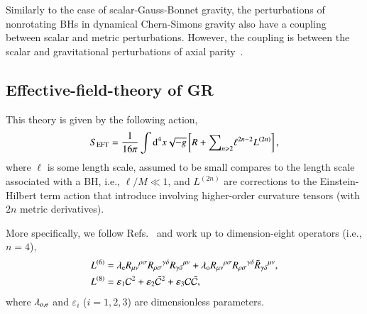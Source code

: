 \documentclass[twocolumn,prd,aps,superscriptaddress,preprintnumbers,tightenlines,showpacs,nofootinbib,amsfonts,amsmath,longbibliography]{revtex4-1}
\newcommand{\dd}{{\rm d}}
\newcommand{\lame}{\lambda_{\rm e}}
\newcommand{\lamo}{\lambda_{\rm o}}
\begin{document}
Similarly to the case of scalar-Gauss-Bonnet gravity, the perturbations of nonrotating
BHs in dynamical Chern-Simons gravity also have a coupling between scalar and
metric perturbations. However, the coupling is between the scalar and gravitational perturbations
of axial parity~\cite{Yunes:2007ss,Cardoso:2009pk,Molina:2010fb,Wagle:2021tam}.

%
%
%

\subsection{Effective-field-theory of GR}

This theory is given by the following action,
%
\begin{equation} \label{eq:action_eft}
    S_{\rm EFT} = \frac{1}{16 \pi}
    \int \dd^4x \sqrt{-g}
    \left[ R
    +
    {\sum}_{n \geqslant 2} \ell^{2n - 2} L^{(2n)}
    \right],
\end{equation}
%
where $\ell$ is some length scale, assumed to be small compares to the length
scale associated with a BH, i.e., $\ell / M \ll 1$, and
$L^{(2n)}$ are corrections to the Einstein-Hilbert term action that
introduce involving higher-order curvature tensors (with $2n$ metric
derivatives).

More specifically, we follow Refs.~\cite{Cano:2020cao,Cano:2021myl} and work up
to dimension-eight operators (i.e., $n=4$),
%
\begin{subequations}
\label{eq:action_mods}
\begin{align}
    L^{(6)} &= \lame R_{\mu\nu}{}^{\rho\sigma} R_{\rho\sigma}{}^{\gamma\delta} R_{\gamma \delta}{}^{\mu\nu}
    + \lamo R_{\mu\nu}{}^{\rho\sigma} R_{\rho\sigma}{}^{\gamma\delta} \tilde{R}_{\gamma \delta}{}^{\mu\nu},
    \label{eq:s_6}
    \\
    L^{(8)} &= \varepsilon_{1} \mathcal{C}^2
    + \varepsilon_{2} \tilde{\mathcal{C}}^{2}
    + \varepsilon_{3} \mathcal{C} \tilde{\mathcal{C}},
\label{eq:s_8}
\end{align}
\end{subequations}
%
where $\lambda_{\rm o, e}$ and $\varepsilon_{i}$ ($i=1,2,3$) are dimensionless parameters.
\end{document}
